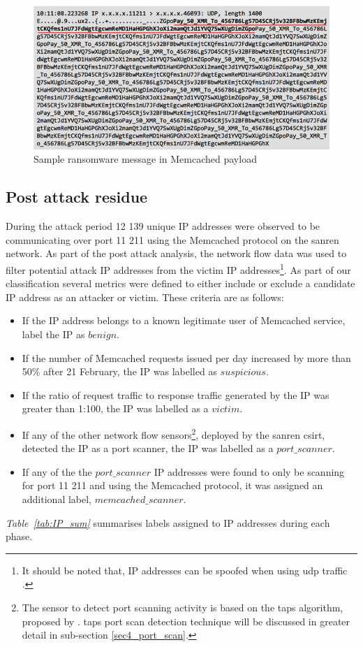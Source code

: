 \begin{figure}[H]
    \centering
    \includegraphics[width=\columnwidth]{section_4/ransom_memcached.PNG}
    \caption{Sample ransomware message in Memcached payload}
    \label{fig:ransom}
\end{figure}


\subsection{Post attack residue}
\label{sub-post-attack}


During the attack period 12 139 unique IP addresses were observed to be communicating over port 11 211 using the Memcached protocol on the \gls{sanren} network. As part of the post attack analysis, the network flow data was used to filter potential attack IP addresses from the victim IP addresses\footnote{It should be noted that,  IP addresses can be spoofed when using \gls{udp} traffic \cite{senie1998network}.}.  As part of our classification several metrics were defined to either include or exclude a candidate IP address as an attacker or victim. These criteria are as follows:
\begin{itemize}
    \item If the IP address belongs to a known legitimate user of Memcached service, label the IP as $benign$. 
    \item If the number of Memcached requests issued per day increased by more than 50\% after 21 February, the IP was labelled as $suspicious$.
    \item If the ratio of request traffic to response traffic generated by the IP was greater than 1:100, the IP was labelled as a $victim$.
    \item If any of the other network flow sensors\footnote{The sensor to detect port scanning activity is based on the \gls{taps} algorithm, proposed by \cite{sridharan2006connectionless}. \gls{taps} port scan detection technique will be discussed in greater detail in sub-section \ref{sec4_port_scan}.}, deployed by the \gls{sanren} \gls{csirt}, detected the IP as a port scanner, the IP was labelled as a $port\_scanner$. 
    \item If any of the the $port\_scanner$ IP addresses were found to only be scanning for port 11 211 and using the Memcached protocol, it was assigned an additional label, $memcached\_scanner$. 
\end{itemize}
\textit{Table~\ref{tab:IP_sum}} summarises labels assigned to IP addresses during each phase.

